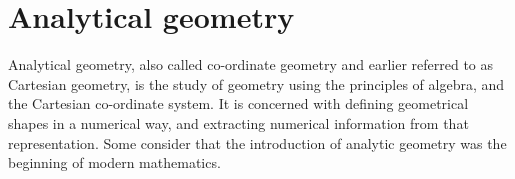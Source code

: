          \chapter{Analytical geometry}
    \setcounter{figure}{1}
    \setcounter{subfigure}{1}
    \label{71522cd1c95e0cbedb9f300409036b1b}
%     
%     
%     
%     
%   
%             
        \label{m39107*id66769}Analytical geometry, also called co-ordinate geometry and earlier referred to as Cartesian geometry, is the study of geometry using the principles of algebra, and the Cartesian co-ordinate system. It is concerned with defining geometrical shapes in a numerical way, and extracting numerical information from that representation. Some consider that the introduction of analytic geometry was the beginning of modern mathematics.\par 
      \label{m39107*eip-448}
